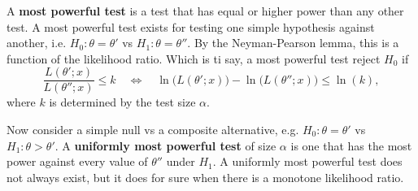 \documentclass[12pt]{article}
\theoremstyle{definition}
\begin{document}
A \textbf{most powerful test} is a test that has equal or higher power than any other test. A most powerful test exists for testing one simple hypothesis against another, i.e. $H_0:\theta=\theta'$ vs $H_1: \theta=\theta''$. By the Neyman-Pearson lemma, this is a function of the likelihood ratio. Which is ti say, a most powerful test reject $H_0$ if
	\[	\frac{L(\theta';x)}{L(\theta'';x)} \leq k \quad \Longleftrightarrow \quad \ln\big( L(\theta';x) \big) - \ln\big( L(\theta'';x)\big) \leq \ln(k), \]
where $k$ is determined by the test size $\alpha$. 

Now consider a simple null vs a composite alternative, e.g. $H_0: \theta = \theta'$ vs $H_1: \theta > \theta'$. A \textbf{uniformly most powerful test} of size $\alpha$ is one that has the most power against every value of $\theta''$ under $H_1$. A uniformly most powerful test does not always exist, but it does for sure when there is a monotone likelihood ratio. 
\end{document}
